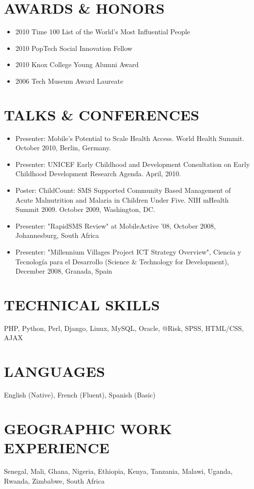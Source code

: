 \documentclass{res}
\begin{document}
\begin{resume}
\section{AWARDS \& HONORS}
\begin{itemize} \itemsep -2pt
	\item 2010 Time 100 List of the World's Most Influential People
	\item 2010 PopTech Social Innovation Fellow
    \item 2010 Knox College Young Alumni Award
	\item 2006 Tech Museum Award Laureate
\end{itemize}

\section{TALKS \& CONFERENCES}
\begin{itemize} \itemsep -2pt
	\item Presenter: Mobile's Potential to Scale Health Access. World Health Summit.  October 2010, Berlin, Germany.
	\item Presenter: UNICEF Early Childhood and Development Consultation on Early Childhood Development Research Agenda. April, 2010.
	\item Poster: ChildCount: SMS Supported Community Based Management of Acute Malnutrition and Malaria in Children Under Five.  NIH mHealth Summit	2009.  October 2009, Washington, DC.
	\item Presenter: "RapidSMS Review" at MobileActive '08, October 2008, Johannesburg, South Africa
	\item Presenter: "Millennium Villages Project ICT Strategy Overview", Ciencia y Tecnología para el Desarrollo (Science \& Technology for Development), December 2008, Granada, Spain
\end{itemize}

\section{TECHNICAL SKILLS}
\vspace{8pt} 
PHP, Python, Perl, Django, Linux, MySQL, Oracle, @Risk, SPSS, HTML/CSS, AJAX

\section{LANGUAGES} 
\vspace{8pt}
English (Native), French (Fluent), Spanish (Basic)

\section{GEOGRAPHIC WORK EXPERIENCE} 
\vspace{8pt}
Senegal, Mali, Ghana, Nigeria, Ethiopia, Kenya, Tanzania, Malawi, Uganda, Rwanda, Zimbabwe, South Africa

\end{resume} 
\end{document}
